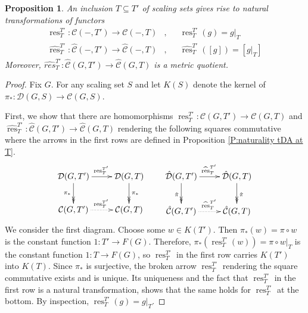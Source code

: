 \documentclass[12pt]{amsart}
\newtheorem{prop}{Proposition}[section]
\theoremstyle{definition}
\def\res{\operatorname{res}}
\newcommand{\C}[1]{\mathcal{#1}}
\def\Free{F}
\def\D{\mathcal{D}}
\def\tC{\hat{\mathcal{C}}}
\def\tD{\hat{\D}}
\begin{document}
\begin{prop}\label{P:naturality tC scaling sets}
An inclusion  $T \subseteq T'$ of scaling sets gives rise to natural transformations of functors
\begin{align*}
\res^{T'}_T \colon \C C(-,T') \to \C C(-,T)    & ,&  &\res^{T'}_T(g) = g|_T \\
\widehat{\res}^{T'}_T \colon \tC(-,T') \to \tC(-,T)      & ,& & \hat{\res}^{T'}_T([g]) = [g|_T]
\end{align*}
Moreover, $\widehat{res}^{T'}_T \colon \tC(G,T') \to \tC(G,T)$ is a metric quotient.
\end{prop}

\begin{proof}
Fix $G$.
For any scaling set $S$ and let $K(S)$ denote the kernel of $\pi_* \colon \C D(G,S) \to \C C(G,S)$.

First, we show that there are homomorphisms $\res^{T'}_T \colon \C C(G,T') \to \C C(G,T)$ and $\widehat{\res}^{T'}_T \colon \tC(G,T') \to \tC(G,T)$ rendering the following squares commutative where the arrows in the first rows are defined in Proposition \ref{P:naturality tDA at T}.
\[
\xymatrix{
\C D(G,T') \ar[r]^{\res^{T'}_T} \ar@{->>}[d]_{\pi_*} &
\C D(G,T) \ar@{->>}[d]^{\pi_*} 
\\
\C C(G,T') \ar@{.>}[r]^{\res^{T'}_T} &
\C C(G,T)
}
\qquad
\xymatrix{
\tD(G,T') \ar[r]^{\widehat{\res}^{T'}_T} \ar@{->>}[d]_{\hat{\pi}} &
\tD(G,T) \ar@{->>}[d]^{\hat{\pi}} 
\\
\tC(G,T') \ar@{.>}[r]^{\widehat{\res}^{T'}_T} &
\tC(G,T)
}
\]
We consider the first diagram.
Choose some $w \in K(T')$.
Then $\pi_*(w) = \pi \circ w$ is the constant function $1 \colon T' \to \Free(G)$.
Therefore, $\pi_*(\res^{T'}_T(w)) = \pi \circ w|_T$ is the constant function $1 \colon T \to \Free(G)$, so $\res^{T'}_T$ in the first row carries $K(T')$ into $K(T)$.
Since $\pi_*$ is surjective, the broken arrow $\res^{T'}_T$ rendering the square commutative exists and is unique.
Its uniqueness and the fact that $\res^{T'}_T$ in the first row is a natural transformation, shows that the same holds for $\res^{T'}_T$ at the bottom.
By inspection, $\res^{T'}_T(g) = g|_T$.


\end{proof}
\end{document}
